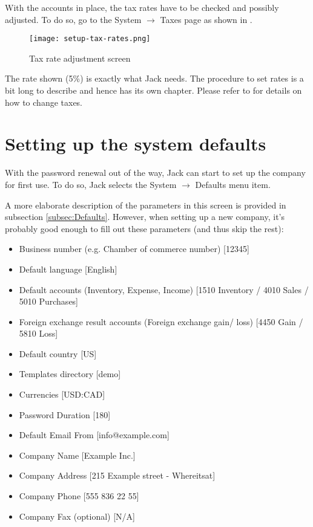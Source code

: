 With the accounts in place, the tax rates have to be checked and possibly adjusted.
To do so, go to the System $\rightarrow$ Taxes page as shown in .

\begin{figure}[h]
\texttt{[image: setup-tax-rates.png]}
\caption{Tax rate adjustment screen}
\label{fig:setup-tax-rates}
\end{figure}

The rate shown (5\%) is exactly what Jack needs. The procedure to set rates is a bit
long to describe and hence has its own chapter. Please refer to  for
details on how to change taxes.

\section{Setting up the system defaults}
\label{sec:setting-up-system-defaults}

With the password renewal out of the way, Jack can start to set up the company for first
use. To do so, Jack selects the System $\rightarrow$ Defaults menu item.

A more elaborate description of the parameters in this screen is provided in subsection
\ref{subsec:Defaults}. However, when setting up a new company, it's probably good enough
to fill out these parameters (and thus skip the rest):

\begin{itemize}
\item Business number (e.g. Chamber of commerce number) [12345]
\item Default language [English]
\item Default accounts (Inventory, Expense, Income) [1510 Inventory / 4010 Sales / 5010 Purchases]
\item Foreign exchange result accounts (Foreign exchange gain/ loss) [4450 Gain / 5810 Loss]
\item Default country [US]
\item Templates directory [demo]
\item Currencies [USD:CAD]
\item Password Duration [180]
\item Default Email From [info@example.com]
\item Company Name [Example Inc.]
\item Company Address [215 Example street - Whereitsat]
\item Company Phone [555 836 22 55]
\item Company Fax (optional) [N/A]
\end{itemize}

